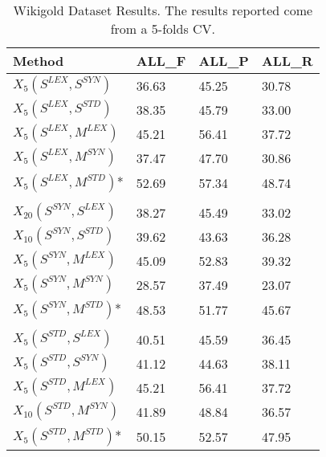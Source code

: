 \begin{table*}[]
\centering
\begin{tabular}{@{}llll@{}}
\toprule
\textbf{Method} & \textbf{ALL\_F} & \textbf{ALL\_P} & \textbf{ALL\_R} \\ \midrule
$X_5(S^{LEX}, S^{SYN})$      & 36.63           & 45.25           & 30.78           \\
$X_5(S^{LEX}, S^{STD})$  & 38.35           & 45.79            & 33.00     \\ 
$X_5(S^{LEX}, M^{LEX})$  & 45.21           & 56.41            & 37.72           \\ 
$X_5(S^{LEX}, M^{SYN})$  & 37.47           & 47.70            & 30.86           \\ 
$X_5(S^{LEX}, M^{STD})$* & 52.69           & 57.34            & 48.74           \\  
%
                             &       &       &       \\
$X_{20}(S^{SYN}, S^{LEX})$     & 38.27          & 45.49           & 33.02           \\
$X_{10}(S^{SYN}, S^{STD})$  & 39.62           & 43.63            & 36.28     \\ 
$X_5(S^{SYN}, M^{LEX})$ &  45.09          & 52.83            & 39.32          \\ 
$X_5(S^{SYN}, M^{SYN})$  & 28.57           & 37.49            & 23.07           \\ 
$X_5(S^{SYN}, M^{STD})$*  & 48.53           & 51.77            & 45.67           \\  
%
                             &       &       &       \\
$X_5(S^{STD}, S^{LEX})$      & 40.51           & 45.59           & 36.45           \\
$X_5(S^{STD}, S^{SYN})$  &41.12				&44.63						&38.11   \\ 
$X_5(S^{STD}, M^{LEX})$  & 45.21           & 56.41            & 37.72           \\ 
$X_{10}(S^{STD}, M^{SYN})$  & 41.89           & 48.84            & 36.57           \\ 
$X_5(S^{STD}, M^{STD})$*  &50.15	&52.57	&47.95            \\  \bottomrule
%
%

\end{tabular}
\caption{Wikigold Dataset Results. The results reported come from a 5-folds CV.}
\label{tab:wikigold}
\end{table*}
